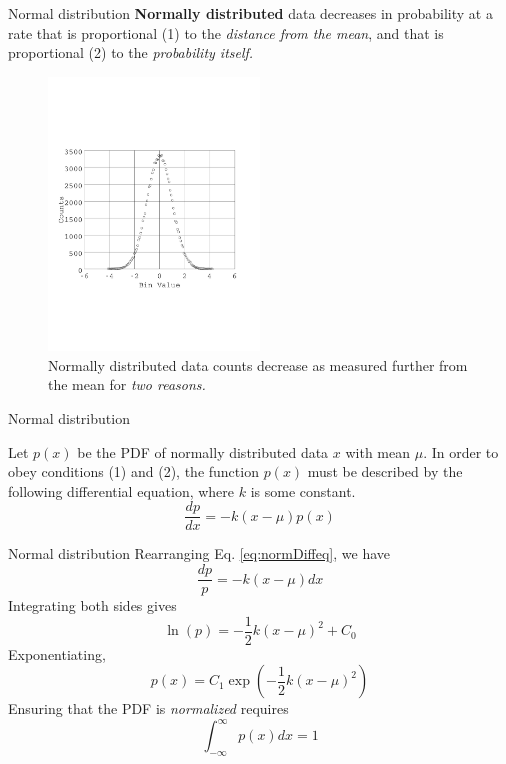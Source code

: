 \documentclass{beamer}
\begin{document}
\begin{frame}{Normal distribution}
\textbf{Normally distributed} data decreases in probability at a rate that is proportional (1) to the \textit{distance from the mean}, and that is proportional (2) to the \textit{probability itself.}
\begin{figure}
\centering
\includegraphics[width=0.5\textwidth,trim=0cm 6cm 0cm 6cm,clip=true]{figures/hist_binCount.pdf}
\caption{\label{fig:hist1} Normally distributed data counts decrease as measured further from the mean for \textit{two reasons.}}
\end{figure}
\end{frame}

\begin{frame}{Normal distribution}
\begin{tcolorbox}[colback=white,colframe=red!40!blue,title=Normal Distribution PDF]
\alert{Let $p(x)$ be the PDF of normally distributed data $x$ with mean $\mu$. In order to obey conditions (1) and (2), the function $p(x)$ must be described by the following differential equation, where $k$ is some constant.}
\alert{\begin{equation}
\frac{dp}{dx} = -k(x-\mu)p(x) \label{eq:normDiffeq}
\end{equation}}
\end{tcolorbox}
\end{frame}

\begin{frame}{Normal distribution}
Rearranging Eq. \ref{eq:normDiffeq}, we have
\begin{equation}
\frac{dp}{p} = -k(x-\mu) dx
\end{equation}
Integrating both sides gives
\begin{equation}
\ln(p) = -\frac{1}{2}k(x-\mu)^2+C_0
\end{equation}
Exponentiating,
\begin{equation}
p(x) = C_1 \exp\left(-\frac{1}{2}k(x-\mu)^2\right) \label{eq:normDiffeq2}
\end{equation}
Ensuring that the PDF is \textit{normalized} requires
\begin{equation}
\int_{-\infty}^{\infty} p(x) dx = 1
\end{equation}
\end{frame}
\end{document}
